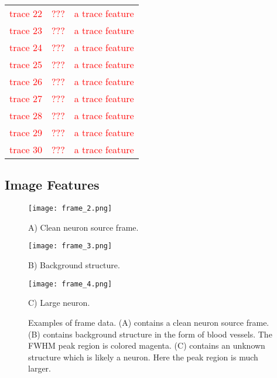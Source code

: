 \documentclass[10pt]{article}
\newcommand{\todo}[1]{\textcolor{red}{#1}}
\begin{document}
\begin{table}[h]
\begin{tabular}{lll}
    \todo{trace 22} & \todo{???} &  \todo{a trace feature} \\
    \addlinespace[2pt]
    \todo{trace 23} & \todo{???} &  \todo{a trace feature} \\
    \addlinespace[2pt]
    \todo{trace 24} & \todo{???} &  \todo{a trace feature} \\
    \addlinespace[2pt]
    \todo{trace 25} & \todo{???} &  \todo{a trace feature} \\
    \addlinespace[2pt]
    \todo{trace 26} & \todo{???} &  \todo{a trace feature} \\
    \addlinespace[2pt]
    \todo{trace 27} & \todo{???} &  \todo{a trace feature} \\
    \addlinespace[2pt]
    \todo{trace 28} & \todo{???} &  \todo{a trace feature} \\
    \addlinespace[2pt]
    \todo{trace 29} & \todo{???} &  \todo{a trace feature} \\
    \addlinespace[2pt]
    \todo{trace 30} & \todo{???} &  \todo{a trace feature} \\

    \bottomrule
  \end{tabular}
\end{table}

\subsection{Image Features}

\begin{figure}[h]
    \centering
    \begin{minipage}{.33\textwidth}
      \centering
      \texttt{[image: frame\_2.png]}
      \caption*{\footnotesize A) Clean neuron source frame.}
      \label{fig:frame1}
    \end{minipage}%
    \begin{minipage}{.33\textwidth}
      \centering
      \texttt{[image: frame\_3.png]}
      \caption*{\footnotesize B) Background structure. }
      \label{fig:frame2}
    \end{minipage}
    \begin{minipage}{.33\textwidth}
      \centering
      \texttt{[image: frame\_4.png]}
      \caption*{\footnotesize C) Large neuron. }
      \label{fig:frame3}
    \end{minipage}
    \caption{\footnotesize Examples of frame data. (A) contains a clean neuron source frame. (B) contains background structure in the form of blood vessels. The FWHM peak region is colored magenta. (C) contains an unknown structure which is likely a neuron. Here the peak region is much larger. }
\end{figure}
\end{document}
